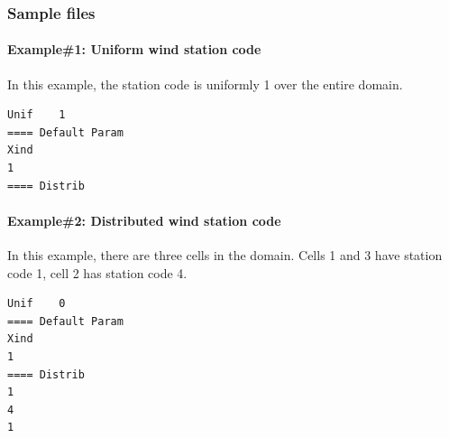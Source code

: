 \subsubsection{Sample files}
%
\paragraph*{Example\#1: Uniform wind station code}
In this example, the station code is uniformly 1 over the entire domain.
\begin{verbatim}
Unif	1
==== Default Param
Xind
1
==== Distrib
\end{verbatim}
%
\paragraph*{Example\#2: Distributed wind station code}
In this example, there are three cells in the domain. Cells 1 and 3 have station code 1, cell 2 has station code 4.
\begin{verbatim}
Unif	0
==== Default Param
Xind
1
==== Distrib
1
4
1
\end{verbatim}